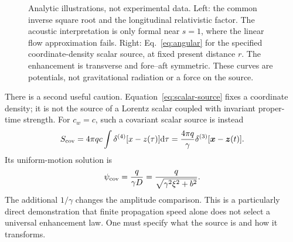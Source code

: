 \documentclass[11pt,a4paper]{article}
\numberwithin{equation}{section}
\newcommand{\dd}{\mathrm{d}}
\begin{document}
\begin{figure}[t]
\centering
{}\hfill
{}
\caption{Analytic illustrations, not experimental data. Left: the common inverse square root and the longitudinal relativistic factor. The acoustic interpretation is only formal near $s=1$, where the linear flow approximation fails. Right: Eq.~\eqref{eq:angular} for the specified coordinate-density scalar source, at fixed present distance $r$. The enhancement is transverse and fore--aft symmetric. These curves are potentials, not gravitational radiation or a force on the source.}
\label{fig:comparison}
\end{figure}

There is a second useful caution. Equation~\eqref{eq:scalar-source} fixes a coordinate density; it is not the source of a Lorentz scalar coupled with invariant proper-time strength. For $c_w=c$, such a covariant scalar source is instead
\begin{equation}
 S_{\rm cov}=4\pi q c\int\delta^{(4)}[x-z(\tau)]\dd\tau
 =\frac{4\pi q}{\gamma}\delta^{(3)}[\bm x-\bm z(t)].
\end{equation}
Its uniform-motion solution is
\begin{equation}
 \psi_{\rm cov}=\frac{q}{\gamma D}
 =\frac{q}{\sqrt{\gamma^2\xi^2+b^2}}.
 \label{eq:cov-scalar}
\end{equation}
The additional $1/\gamma$ changes the amplitude comparison. This is a particularly direct demonstration that finite propagation speed alone does not select a universal enhancement law. One must specify what the source is and how it transforms.
\end{document}
